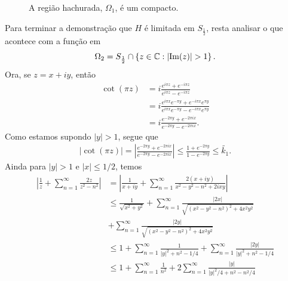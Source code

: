 \begin{exemplo}
\begin{figure}[H]
            \caption{%
                A região hachurada, $\Omega_1$, é um compacto.
            }
        \end{figure}
        Para terminar a demonstração que $H$ é limitada em $S_{\frac{1}{2}}$,
        resta analisar o que acontece com a função em
        \begin{equation*}
            \Omega_2 = S_{\frac{1}{2}} \cap \left\{ z\in\mathbb{C} : |\mathrm{Im}(z)| > 1 \right\}.
        \end{equation*}
        Ora, se $z = x + iy$, então
        \begin{align*}
            \cot(\pi z) &= 
            i\frac{ e^{i\pi z} + e^{-i\pi z} }{ e^{i\pi z} - e^{-i\pi z} } \\
            &= i\frac{ e^{i\pi x}e^{-\pi y} + e^{-i\pi x}e^{\pi y} }
            { e^{i\pi x}e^{-\pi y} - e^{-i\pi x}e^{\pi y} } \\
            &= i\frac{ e^{-2\pi y} + e^{-2\pi ix} }{ e^{-2\pi y} - e^{-2\pi ix} }.
        \end{align*}
        Como estamos supondo $|y|>1$, segue que
        \begin{align*}
            |\cot(\pi z)| = 
            \left| 
            \frac{ e^{-2\pi y} + e^{-2\pi ix} }{ e^{-2\pi y} - e^{-2\pi ix} } 
            \right|
            \leq \frac{ 1 + e^{-2\pi y} }{ 1 - e^{-2\pi y} }
            \leq \widetilde{k_1}.
        \end{align*}
        Ainda para $|y|>1$ e $|x|\leq 1/2$, temos
        \begin{align*}
            \left| 
            \frac{1}{z} + \sum_{n=1}^{\infty} \frac{2z}{z^2 - n^2} 
            \right|
            &= \left| 
            \frac{1}{x+iy} + \sum_{n=1}^{\infty} \frac{2(x+iy)}{x^2 - y^2 - n^2 +2ixy} 
            \right| \\
            &\leq \frac{1}{\sqrt{x^2 + y^2}} 
            + \sum_{n=1}^{\infty} \frac{|2x|}{\sqrt{(x^2 - y^2 - n^2)^2 + 4x^2y^2}} \\
            &+ \sum_{n=1}^{\infty} \frac{|2y|}{\sqrt{(x^2 - y^2 - n^2)^2 + 4x^2y^2}} \\
            &\leq 1 
            + \sum_{n=1}^{\infty} \frac{1}{|y|^2 + n^2 - 1/4}
            + \sum_{n=1}^{\infty} \frac{|2y|}{|y|^2 + n^2 - 1/4} \\
            &\leq 1 + \sum_{n=1}^{\infty} \frac{1}{n^2} 
            + 2\sum_{n=1}^{\infty} \frac{|y|}{|y|^2/4 + n^2 - n^2/4} \\

\end{align*}
\end{exemplo}
